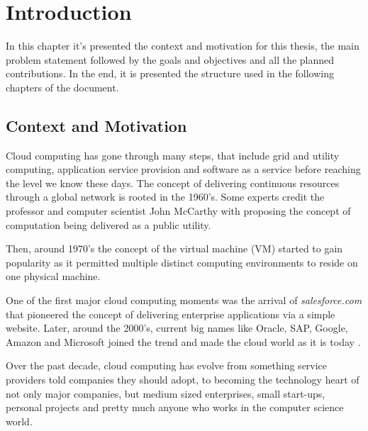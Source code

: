 \newcommand{\novathesis}{\emph{novathesis}}
\newcommand{\novathesisclass}{\texttt{novathesis.cls}}


\chapter{Introduction}
\label{cha:introduction}

In this chapter it's presented the context and motivation for this thesis, the main problem statement followed by the goals and objectives and all the planned contributions. In the end, it is presented the structure used in the following chapters of the document.

\section{Context and Motivation} %
\label{sec:context_and_motivation}

Cloud computing has gone through many steps, that include grid and utility computing, application service provision and software as a service before reaching the level we know these days. The concept of delivering continuous resources through a global network is rooted in the 1960's. Some experts credit the professor and computer scientist John McCarthy \cite{john_mcCarthy:1} with proposing the concept of computation being delivered as a public utility.

Then, around 1970's the concept of the virtual machine (\gls{VM}) started to gain popularity as it permitted multiple distinct computing environments to reside on one physical machine.

One of the first major cloud computing moments was the arrival of \textit{salesforce.com} that pioneered the concept of delivering enterprise applications via a simple website. Later, around the 2000's, current big names like Oracle, SAP, Google, Amazon and Microsoft joined the trend and made the cloud world as it is today \cite{cloud_history:1, cloud_history:2}.

Over the past decade, cloud computing has evolve from something service providers told companies they should adopt, to becoming the technology heart of not only major companies, but medium sized enterprises, small start-ups, personal projects and pretty much anyone who works in the computer science world. 

